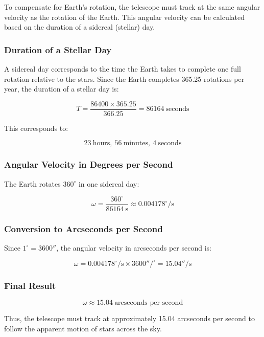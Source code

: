 \documentclass[12pt,a4paper]{article}
\begin{document}
To compensate for Earth's rotation, the telescope must track at the same angular velocity as the rotation of the Earth. This angular velocity can be calculated based on the duration of a sidereal (stellar) day.

\subsubsection*{Duration of a Stellar Day}

A sidereal day corresponds to the time the Earth takes to complete one full rotation relative to the stars. Since the Earth completes 365.25 rotations per year, the duration of a stellar day is:

\[
T = \frac{86400 \times 365.25}{366.25} = 86164\ \text{seconds}
\]

This corresponds to:

\[
\boxed{23\ \text{hours},\ 56\ \text{minutes},\ 4\ \text{seconds}}
\]

\subsubsection*{Angular Velocity in Degrees per Second}

The Earth rotates $360^\circ$ in one sidereal day:

\[
\omega = \frac{360^\circ}{86164\ \text{s}} \approx 0.004178^\circ/\text{s}
\]

\subsubsection*{Conversion to Arcseconds per Second}

Since $1^\circ = 3600''$, the angular velocity in arcseconds per second is:

\[
\omega = 0.004178^\circ/\text{s} \times 3600''/^\circ = 15.04''/\text{s}
\]

\subsubsection*{Final Result}

\[
\boxed{\omega \approx 15.04\ \text{arcseconds per second}}
\]

Thus, the telescope must track at approximately 15.04 arcseconds per second to follow the apparent motion of stars across the sky.
\end{document}
